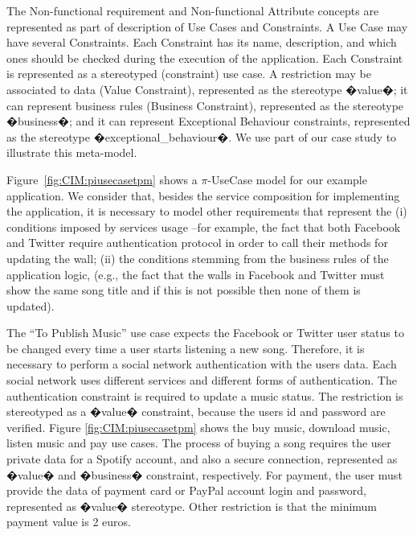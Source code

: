  The {\sc Non-functional requirement} and {\sc Non-functional Attribute} concepts are represented as part of description of {\sc Use Cases} and {\sc Constraints}. 
A {\sc Use Case} may have several {\sc Constraints}. Each {\sc Constraint} has its name, description, and which ones should be checked during the execution of the application. Each {\sc Constraint} is represented as a stereotyped ({\sf constraint}) use case. A restriction may be associated to data ({\sc Value Constraint}), represented as the stereotype �value�; it can represent business rules (Business Constraint), represented as the stereotype {\sf �business�}; and it can represent {\sc Exceptional Behaviour} constraints, represented as the stereotype {\sf �exceptional\_behaviour�}.
 We use part of our case study to illustrate this meta-model. 
 \begin{example}\label{ex:toPublicMusic2}
Figure~\ref{fig:CIM:piusecasetpm} shows a $\pi$-UseCase model for our example application.
We consider that, besides the service composition for implementing the application, it is necessary to model  other requirements that represent the (i) conditions imposed by services usage --for example, the fact that both Facebook and Twitter require authentication protocol in order to call their methods for updating the wall; (ii) the conditions stemming from the business rules of the application logic, (e.g., the fact that the walls in Facebook and Twitter must show the same song title and if this is not possible then none of them is updated). 
 
The ``To Publish Music'' use case expects  the Facebook or Twitter user status to be changed every time a user starts listening a new song.
  Therefore, it is necessary to perform a social network authentication with the users data. Each social network uses different services and different forms of authentication. The authentication constraint is required to update a music status. The restriction is stereotyped as a �value� constraint, because the users id and password are verified.  Figure \ref{fig:CIM:piusecasetpm} shows the buy music, download music, listen music and pay use cases. The process of buying a song requires the user private data for a Spotify account, and also a secure connection, represented as �value� and �business� constraint, respectively. For payment, the user must provide the data of payment card or PayPal account login and password, represented as �value� stereotype. Other restriction is that the minimum payment value is 2 euros.
\end{example}

